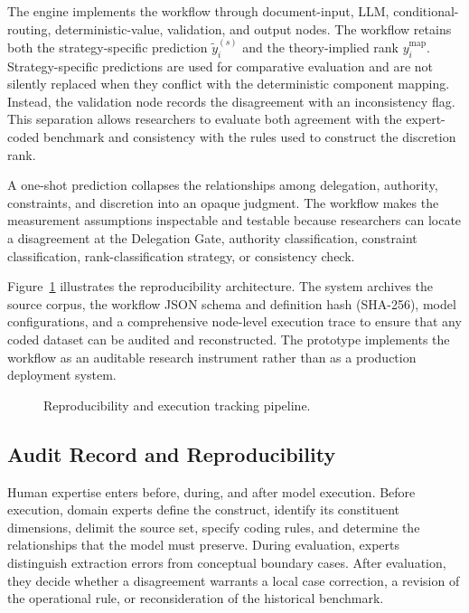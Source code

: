\documentclass[runningheads]{llncs}
\begin{document}
 The engine implements the workflow through document-input, LLM, conditional-routing, deterministic-value, validation, and output nodes. The workflow retains both the strategy-specific prediction \(\tilde y_i^{(s)}\) and the theory-implied rank \(y_i^{\mathrm{map}}\). Strategy-specific predictions are used for comparative evaluation and are not silently replaced when they conflict with the deterministic component mapping. Instead, the validation node records the disagreement with an inconsistency flag. This separation allows researchers to evaluate both agreement with the expert-coded benchmark and consistency with the rules used to construct the discretion rank.

A one-shot prediction collapses the relationships among delegation, authority, constraints, and discretion into an opaque judgment. The workflow makes the measurement assumptions inspectable and testable because researchers can locate a disagreement at the Delegation Gate, authority classification, constraint classification, rank-classification strategy, or consistency check. 

Figure~\ref{fig:reproducibility} illustrates the reproducibility architecture. The system archives the source corpus, the workflow JSON schema and definition hash (SHA-256), model configurations, and a comprehensive node-level execution trace to ensure that any coded dataset can be audited and reconstructed. The prototype implements the workflow as an auditable research instrument rather than as a production deployment system.

\begin{figure}[t]
\centering
\resizebox{0.78\textwidth}{!}{}
\caption{Reproducibility and execution tracking pipeline.}
\label{fig:reproducibility}
\end{figure}
\vspace{-0.2 cm}
\subsection{Audit Record and Reproducibility}
\vspace{-0.2 cm}
Human expertise enters before, during, and after model execution. Before execution, domain experts define the construct, identify its constituent dimensions, delimit the source set, specify coding rules, and determine the relationships that the model must preserve. During evaluation, experts distinguish extraction errors from conceptual boundary cases. After evaluation, they decide whether a disagreement warrants a local case correction, a revision of the operational rule, or reconsideration of the historical benchmark.
\end{document}
